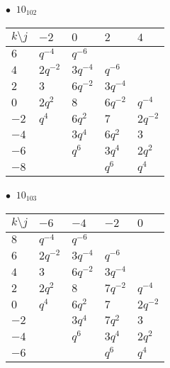 \begin{minipage}{\linewidth}
$\bullet\ $ $10_{102}$ \vspace{0.5em} \\
\begin{tabular}{l|llll}
$k \setminus j$ & $-2$ & $0$ & $2$ & $4$ \\
\hline
$6$ & $q^{-4}$ & $q^{-6}$ &  &  \\
$4$ & $2q^{-2}$ & $3q^{-4}$ & $q^{-6}$ &  \\
$2$ & $3$ & $6q^{-2}$ & $3q^{-4}$ &  \\
$0$ & $2q^{2}$ & $8$ & $6q^{-2}$ & $q^{-4}$ \\
$-2$ & $q^{4}$ & $6q^{2}$ & $7$ & $2q^{-2}$ \\
$-4$ &  & $3q^{4}$ & $6q^{2}$ & $3$ \\
$-6$ &  & $q^{6}$ & $3q^{4}$ & $2q^{2}$ \\
$-8$ &  &  & $q^{6}$ & $q^{4}$ \\
\end{tabular}
\vspace{2em}
\end{minipage}
%
\begin{minipage}{\linewidth}
$\bullet\ $ $10_{103}$ \vspace{0.5em} \\
\begin{tabular}{l|llll}
$k \setminus j$ & $-6$ & $-4$ & $-2$ & $0$ \\
\hline
$8$ & $q^{-4}$ & $q^{-6}$ &  &  \\
$6$ & $2q^{-2}$ & $3q^{-4}$ & $q^{-6}$ &  \\
$4$ & $3$ & $6q^{-2}$ & $3q^{-4}$ &  \\
$2$ & $2q^{2}$ & $8$ & $7q^{-2}$ & $q^{-4}$ \\
$0$ & $q^{4}$ & $6q^{2}$ & $7$ & $2q^{-2}$ \\
$-2$ &  & $3q^{4}$ & $7q^{2}$ & $3$ \\
$-4$ &  & $q^{6}$ & $3q^{4}$ & $2q^{2}$ \\
$-6$ &  &  & $q^{6}$ & $q^{4}$ \\
\end{tabular}
\vspace{2em}
\end{minipage}
%
